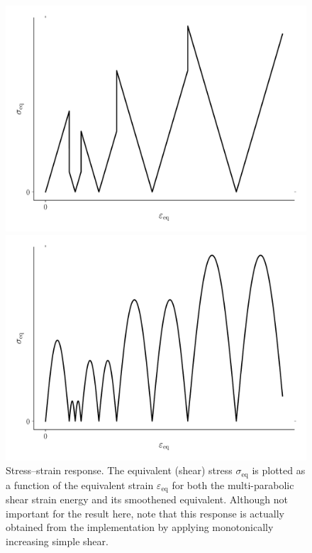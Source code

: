 \documentclass[times,namecite]{goose-article}
\begin{document}
\begin{figure}[htp]
  \centering
  \captionsetup[subfigure]{justification=centering}
  \begin{minipage}[t]{.49\textwidth}
    \centering
    \includegraphics[width=1.\textwidth]{stress-strain}
  \end{minipage}
  \hfill
  \begin{minipage}[t]{.49\textwidth}
    \centering
    \includegraphics[width=1.\textwidth]{stress-strain-smooth}
  \end{minipage}
  \caption{Stress--strain response. The equivalent (shear) stress $\sigma_\mathrm{eq}$ is plotted as a function of the equivalent strain $\varepsilon_\mathrm{eq}$ for both the multi-parabolic shear strain energy and its smoothened equivalent. Although not important for the result here, note that this response is actually obtained from the implementation by applying monotonically increasing simple shear.}
  \label{fig:sigeq-plas}
\end{figure}
\end{document}
